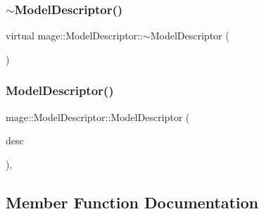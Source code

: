 \hypertarget{classmage_1_1_model_descriptor_a3bc8ee3d1cb8d2675374727edce3d593}{}\label{classmage_1_1_model_descriptor_a3bc8ee3d1cb8d2675374727edce3d593} 
\subsubsection{\texorpdfstring{$\sim$\+Model\+Descriptor()}{~ModelDescriptor()}}
{\footnotesize\ttfamily virtual mage\+::\+Model\+Descriptor\+::$\sim$\+Model\+Descriptor (\begin{DoxyParamCaption}{ }\end{DoxyParamCaption})\hspace{0.3cm}{\ttfamily [virtual]}}

\hypertarget{classmage_1_1_model_descriptor_af44185efc20e10ede762d29bc454c5f3}{}\label{classmage_1_1_model_descriptor_af44185efc20e10ede762d29bc454c5f3} 
\subsubsection{\texorpdfstring{Model\+Descriptor()}{ModelDescriptor()}\hspace{0.1cm}{\footnotesize\ttfamily [2/2]}}
{\footnotesize\ttfamily mage\+::\+Model\+Descriptor\+::\+Model\+Descriptor (\begin{DoxyParamCaption}\item[{const \hyperlink{classmage_1_1_model_descriptor}{Model\+Descriptor} \&}]{desc }\end{DoxyParamCaption})\hspace{0.3cm}{\ttfamily [private]}, {\ttfamily [delete]}}



\subsection{Member Function Documentation}
\hypertarget{classmage_1_1_model_descriptor_a325f0e58fda7734ace7a0e296e0d970d}{}\label{classmage_1_1_model_descriptor_a325f0e58fda7734ace7a0e296e0d970d} 
